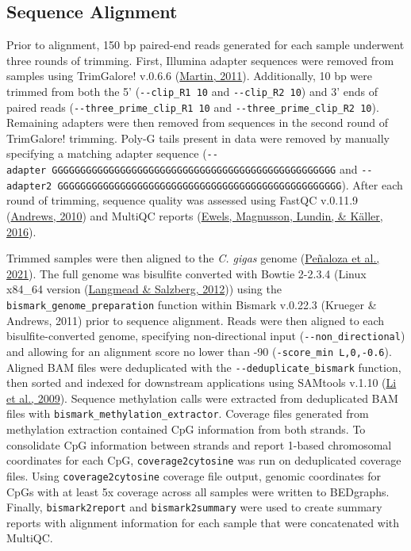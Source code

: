 \documentclass [11pt, proquest] {uwthesis}[2015/03/03]
\begin{document}
\hypertarget{sequence-alignment-2}{%
\subsection{Sequence Alignment}\label{sequence-alignment-2}}

Prior to alignment, 150 bp paired-end reads generated for each sample underwent three rounds of trimming. First, Illumina adapter sequences were removed from samples using TrimGalore! v.0.6.6 (\protect\hyperlink{ref-Martin2011}{Martin, 2011}). Additionally, 10 bp were trimmed from both the 5' (\texttt{-\/-clip\_R1\ 10} and \texttt{-\/-clip\_R2\ 10}) and 3' ends of paired reads (\texttt{-\/-three\_prime\_clip\_R1\ 10} and \texttt{-\/-three\_prime\_clip\_R2\ 10}). Remaining adapters were then removed from sequences in the second round of TrimGalore! trimming. Poly-G tails present in data were removed by manually specifying a matching adapter sequence (\texttt{-\/-adapter\ GGGGGGGGGGGGGGGGGGGGGGGGGGGGGGGGGGGGGGGGGGGGGGGGGG} and \texttt{-\/-adapter2\ GGGGGGGGGGGGGGGGGGGGGGGGGGGGGGGGGGGGGGGGGGGGGGGGGG}). After each round of trimming, sequence quality was assessed using FastQC v.0.11.9 (\protect\hyperlink{ref-Andrews2010}{Andrews, 2010}) and MultiQC reports (\protect\hyperlink{ref-Ewels2016}{Ewels, Magnusson, Lundin, \& Käller, 2016}).

Trimmed samples were then aligned to the \emph{C. gigas} genome (\protect\hyperlink{ref-Penaloza2021}{Peñaloza et al., 2021}). The full genome was bisulfite converted with Bowtie 2-2.3.4 (Linux x84\_64 version (\protect\hyperlink{ref-Langmead2012}{Langmead \& Salzberg, 2012})) using the \texttt{bismark\_genome\_preparation} function within Bismark v.0.22.3 (Krueger \& Andrews, 2011) prior to sequence alignment. Reads were then aligned to each bisulfite-converted genome, specifying non-directional input (\texttt{-\/-non\_directional}) and allowing for an alignment score no lower than -90 (\texttt{-score\_min\ L,0,-0.6}). Aligned BAM files were deduplicated with the \texttt{-\/-deduplicate\_bismark} function, then sorted and indexed for downstream applications using SAMtools v.1.10 (\protect\hyperlink{ref-Li2009}{Li et al., 2009}). Sequence methylation calls were extracted from deduplicated BAM files with \texttt{bismark\_methylation\_extractor}. Coverage files generated from methylation extraction contained CpG information from both strands. To consolidate CpG information between strands and report 1-based chromosomal coordinates for each CpG, \texttt{coverage2cytosine} was run on deduplicated coverage files. Using \texttt{coverage2cytosine} coverage file output, genomic coordinates for CpGs with at least 5x coverage across all samples were written to BEDgraphs. Finally, \texttt{bismark2report} and \texttt{bismark2summary} were used to create summary reports with alignment information for each sample that were concatenated with MultiQC.
\end{document}
